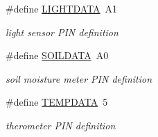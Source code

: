 \begin{DoxyCompactItemize}
\#define \hyperlink{group__const_gac227510232a444c14db6b7a8a4533c76}{L\+I\+G\+H\+T\+D\+A\+TA}~A1
\begin{DoxyCompactList}\small\item\em light sensor P\+IN definition \end{DoxyCompactList}\item 
\#define \hyperlink{group__const_ga867dc19b2b3ce4fcd0024f7c35a26c72}{S\+O\+I\+L\+D\+A\+TA}~A0
\begin{DoxyCompactList}\small\item\em soil moisture meter P\+IN definition \end{DoxyCompactList}\item 
\#define \hyperlink{group__const_gad85c50d1f6e8fb6bba261da3691fcb3f}{T\+E\+M\+P\+D\+A\+TA}~5
\begin{DoxyCompactList}\small\item\em therometer P\+IN definition \end{DoxyCompactList}\end{DoxyCompactItemize}
